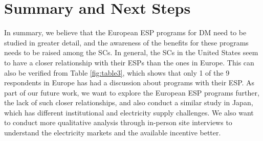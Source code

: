 \section{Summary and Next Steps}
\label{summary}


In summary, we believe that the European ESP programs for DM need to be studied in greater detail, and the awareness of the benefits for these programs needs to be raised among the SCs. In general, the SCs in the United States seem to have a closer relationship with their ESPs than the ones in Europe. This can also be verified from Table \ref{fig:table3}, which shows that only 1 of the 9 respondents in Europe has had a discussion about programs with their ESP. As part of our future work, we want to explore the European ESP programs further, the lack of such closer relationships, and also conduct a similar study in Japan, which has different institutional and electricity supply challenges. We also want to conduct more qualitative analysis through in-person site interviews to understand the electricity markets and the available incentive better. 
